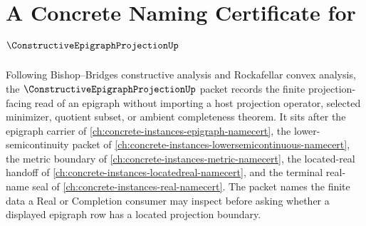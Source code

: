 \chapter{A Concrete Naming Certificate for $\ConstructiveEpigraphProjectionUp$}
\label{ch:concrete-instances-constructive-epigraph-projection-namecert}

Following Bishop--Bridges constructive analysis and Rockafellar convex analysis, the $\ConstructiveEpigraphProjectionUp$ packet records the finite projection-facing read of an epigraph without importing a host projection operator, selected minimizer, quotient subset, or ambient completeness theorem. It sits after the epigraph carrier of \autoref{ch:concrete-instances-epigraph-namecert}, the lower-semicontinuity packet of \autoref{ch:concrete-instances-lowersemicontinuous-namecert}, the metric boundary of \autoref{ch:concrete-instances-metric-namecert}, the located-real handoff of \autoref{ch:concrete-instances-locatedreal-namecert}, and the terminal real-name seal of \autoref{ch:concrete-instances-real-namecert}. The packet names the finite data a Real or Completion consumer may inspect before asking whether a displayed epigraph row has a located projection boundary.

